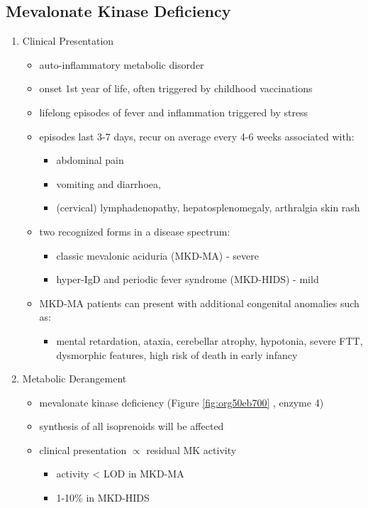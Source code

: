 \documentclass{scrartcl}
\begin{document}
\subsection{Mevalonate Kinase Deficiency}
\label{sec:org2ff18d1}
\begin{enumerate}
\item Clinical Presentation
\label{sec:orgf3345b9}
\begin{itemize}
\item auto-inflammatory metabolic disorder
\item onset 1st year of life, often triggered by childhood vaccinations
\item lifelong episodes of fever and inflammation triggered by stress
\item episodes last 3-7 days, recur on average every 4-6 weeks associated with:
\begin{itemize}
\item abdominal pain
\item vomiting and diarrhoea,
\item (cervical) lymphadenopathy, hepatosplenomegaly, arthralgia skin rash
\end{itemize}
\item two recognized forms in a disease spectrum:
\begin{itemize}
\item classic mevalonic aciduria (MKD-MA) - severe
\item hyper-IgD and periodic fever syndrome (MKD-HIDS) - mild
\end{itemize}

\item MKD-MA patients can present with additional congenital anomalies
such as:
\begin{itemize}
\item mental retardation, ataxia, cerebellar atrophy, hypotonia, severe
FTT, dysmorphic features, high risk of death in early infancy
\end{itemize}
\end{itemize}

\item Metabolic Derangement
\label{sec:org56e215f}
\begin{itemize}
\item mevalonate kinase deficiency (Figure \ref{fig:org50eb700} , enzyme 4)
\end{itemize}
\begin{itemize}
\item synthesis of all isoprenoids will be affected
\item clinical presentation \(\propto\) residual MK activity
\begin{itemize}
\item activity < LOD in MKD-MA
\item 1-10\% in MKD-HIDS
\end{itemize}
\end{itemize}


\end{enumerate}
\end{document}
